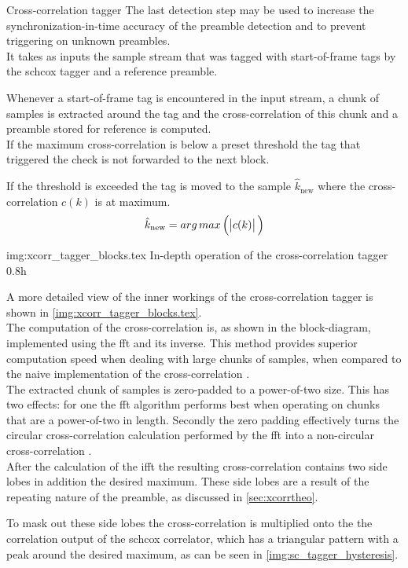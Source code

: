 \begin{subchapter}{Cross-correlation tagger}
  The last detection step may be used to increase the synchronization-in-time
  accuracy of the preamble detection and to prevent triggering on unknown
  preambles. \\

  It takes as inputs the sample stream that was tagged with
  start-of-frame tags by the \acrshort{schcox} tagger
  and a reference preamble.

  Whenever a start-of-frame tag is encountered in the input stream,
  a chunk of samples is extracted around the tag and the
  cross-correlation of this chunk and a preamble stored for reference
  is computed. \\

  If the maximum cross-correlation is below a preset threshold
  the tag that triggered the check is not forwarded to the
  next block.

  If the threshold is exceeded the tag is moved to the sample $\hat{k}_\text{new}$
  where the cross-correlation $c(k)$ is at maximum. \\

  \begin{equation*}
    \hat{k}_\text{new}= arg\,max\left( \, \abs{c(k)} \, \right)
  \end{equation*}

               {img:xcorr_tagger_blocks.tex}
               {In-depth operation of the cross-correlation tagger}
               {0.8}{h}

  A more detailed view of the inner workings of the cross-correlation
  tagger is shown in \autoref{img:xcorr_tagger_blocks.tex}. \\

  The computation of the cross-correlation is, as shown in the
  block-diagram, implemented using the \acrlong{fft} and its inverse.
  This method provides superior computation speed when dealing
  with large chunks of samples, when compared to the naive implementation
  of the cross-correlation \cite{kammeyer2012}. \\

  The extracted chunk of samples is zero-padded to a power-of-two size.
  This has two effects: for one the \acrshort{fft} algorithm performs
  best when operating on chunks that are a power-of-two in length.
  Secondly the zero padding effectively turns the circular cross-correlation
  calculation performed by the \acrshort{fft} into a non-circular cross-correlation
  \cite{kammeyer2012}. \\

  After the calculation of the \acrshort{ifft} the resulting cross-correlation
  contains two side lobes in addition the desired maximum.
  These side lobes are a result of the repeating nature of the preamble, as
  discussed in \autoref{sec:xcorrtheo}.

  To mask out these side lobes the cross-correlation is multiplied onto
  the the correlation output of the \acrlong{schcox} correlator,
  which has a triangular pattern with a peak around the desired
  maximum, as can be seen in \autoref{img:sc_tagger_hysteresis}.
\end{subchapter}
